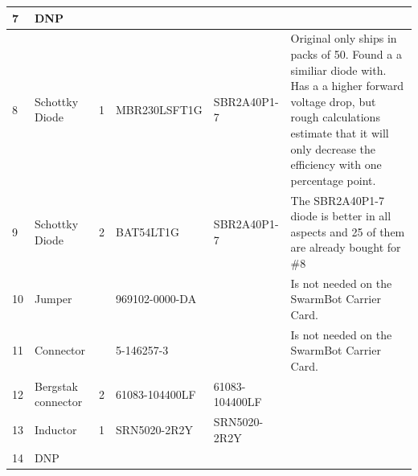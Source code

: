 \begin{table}
\begin{tabular}{|p{0.5cm}|p{2cm}|p{1.5cm}|l|l|p{5cm}|}
7       & DNP                    &          &                       &                       &                                                                                                                                                                                                              \\ \hline
8       & Schottky Diode         & 1        & MBR230LSFT1G          & SBR2A40P1-7           & Original only ships in packs of 50. Found a a similiar diode with. Has a a higher forward voltage drop, but rough calculations estimate that it will only decrease the efficiency with one percentage point. \\ \hline
9       & Schottky Diode         & 2        & BAT54LT1G             & SBR2A40P1-7           & The SBR2A40P1-7 diode is better in all aspects and 25 of them are already bought for \#8                                                                                                                     \\ \hline
10      & Jumper                 &          & 969102-0000-DA        &                       & Is not needed on the SwarmBot Carrier Card.                                                                                                                                                                  \\ \hline
11      & Connector              &          & 5-146257-3            &                       & Is not needed on the SwarmBot Carrier Card.                                                                                                                                                                  \\ \hline
12      & Bergstak connector     & 2        & 61083-104400LF        & 61083-104400LF        &                                                                                                                                                                                                              \\ \hline
13      & Inductor               & 1        & SRN5020-2R2Y          & SRN5020-2R2Y          &                                                                                                                                                                                                              \\ \hline
14      & DNP                    &          &                       &                       &                                                                                                                                                                                                              \\ \hline
\end{tabular}	
\end{table}

